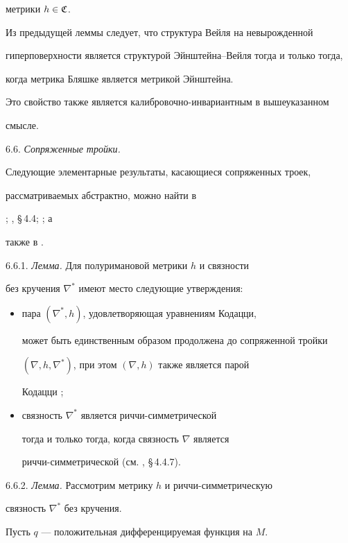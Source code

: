 метрики $h \in \frak C$.

Из предыдущей леммы следует, что структура Вейля на невырожденной

гиперповерхности является структурой Эйнштейна--Вейля тогда и только тогда,

когда метрика Бляшке является метрикой Эйнштейна.

Это свойство также является калибровочно-инвариантным в вышеуказанном

смысле.

\medskip



6.6. {\it Сопряженные тройки.}

Следующие элементарные результаты, касающиеся сопряженных троек,

рассматриваемых абстрактно, можно найти в

\cite{NOM-SI}; \cite{SIM-S-V}, \S\,4.4; \cite{SIM-4}; а

также в \cite{BOK-G-S-2}.

\smallskip



6.6.1. {\it Лемма.} Для полуримановой метрики $h$ и связности

без кручения $\nabla ^*$ имеют место следующие утверждения:

\begin{itemize}

\item[(a)] пара $(\nabla ^*, h)$, удовлетворяющая уравнениям Кодацци,

может быть единственным образом продолжена до сопряженной тройки

$(\nabla, h,\nabla^* )$, при этом $(\nabla, h)$ также является парой

Кодацци \cite{NOM-SI};

\item[(b)] связность $\nabla^*$ является риччи-симметрической

тогда и только тогда, когда связность $\nabla$ является

риччи-симметрической (см.  \cite{SIM-S-V}, \S\,4.4.7).

\end{itemize}



6.6.2. {\it Лемма.} Рассмотрим метрику $h$ и риччи-симметрическую

связность $\nabla ^*$ без кручения.

Пусть $q$ --- положительная дифференцируемая функция на $M$.

